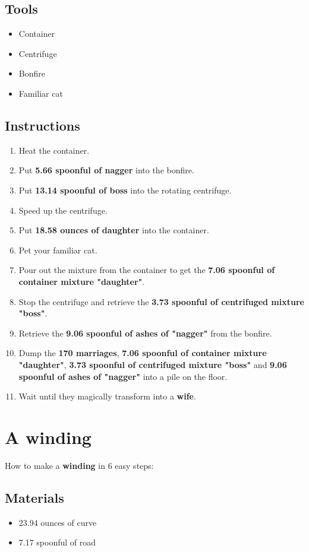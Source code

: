 \documentclass{article}
\begin{document}
\subsection{Tools}\begin{itemize}
\item 
Container
\item 
Centrifuge
\item 
Bonfire
\item 
Familiar cat
\end{itemize}
\subsection{Instructions}\begin{enumerate}
\item 
Heat the container.
\item 
Put \textbf{5.66 spoonful of nagger} into the bonfire.
\item 
Put \textbf{13.14 spoonful of boss} into the rotating centrifuge.
\item 
Speed up the centrifuge.
\item 
Put \textbf{18.58 ounces of daughter} into the container.
\item 
Pet your familiar cat.
\item 
Pour out the mixture from the container to get the \textbf{7.06 spoonful of container mixture "daughter"}.
\item 
Stop the centrifuge and retrieve the \textbf{3.73 spoonful of centrifuged mixture "boss"}.
\item 
Retrieve the \textbf{9.06 spoonful of ashes of "nagger"} from the bonfire.
\item 
Dump the \textbf{170 marriages}, \textbf{7.06 spoonful of container mixture "daughter"}, \textbf{3.73 spoonful of centrifuged mixture "boss"} and \textbf{9.06 spoonful of ashes of "nagger"} into a pile on the floor.
\item 
Wait until they magically transform into a \textbf{wife}.
\end{enumerate}
\newpage
\section{A winding}How to make a \textbf{winding} in 6 easy steps:

\subsection{Materials}\begin{itemize}
\item 
23.94 ounces of curve
\item 
7.17 spoonful of road
\end{itemize}
\end{document}

